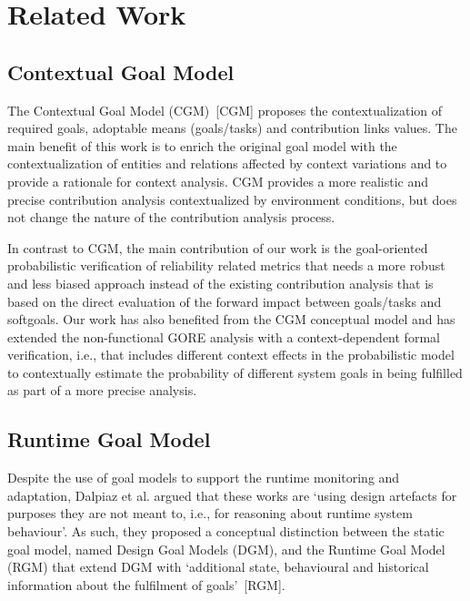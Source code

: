 \chapter{Related Work}\label{ch:related_work}


\section{Contextual Goal Model}

The Contextual Goal Model (CGM)~[CGM] proposes the contextualization of required goals, adoptable means (goals/tasks) and contribution links values. The main benefit of this work is to enrich the original goal model with the contextualization of entities and relations affected by context variations and to provide a rationale for context analysis. CGM provides a more realistic and precise contribution analysis contextualized by environment conditions, but does not change the nature of the contribution analysis process. 

In contrast to CGM, the main contribution of our work is the goal-oriented probabilistic verification of reliability related metrics that needs a more robust and less biased approach instead of the existing contribution analysis that is based on the direct evaluation of the forward impact between goals/tasks and softgoals. Our work has also benefited from the CGM conceptual model and has extended the non-functional GORE analysis with a context-dependent formal verification, i.e., that includes different context effects in the probabilistic model to contextually estimate the probability of different system goals in being fulfilled as part of a more precise analysis.


\section{Runtime Goal Model}

Despite the use of goal models to support the runtime monitoring and adaptation, Dalpiaz et al. argued that these works are `using design artefacts for purposes they are not meant to, i.e., for reasoning about runtime system behaviour'. As such, they proposed a conceptual distinction between the static goal model, named Design Goal Models (DGM), and the Runtime Goal Model (RGM) that extend DGM with `additional state, behavioural and historical information about the fulfilment of goals'~[RGM].

